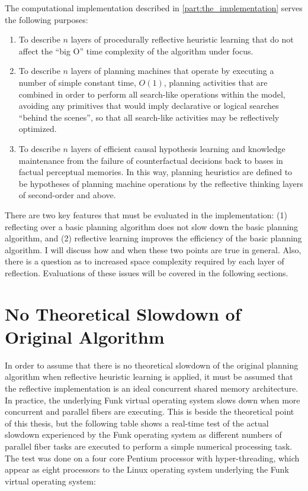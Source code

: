 The computational implementation described in
{\mbox{\autoref{part:the_implementation}}} serves the following
purposes:
\begin{enumerate}
\item To describe $n$ layers of procedurally reflective heuristic
  learning that do not affect the ``big O'' time complexity of the
  algorithm under focus.
\item To describe $n$ layers of planning machines that operate by
  executing a number of simple constant time, $O(1)$, planning
  activities that are combined in order to perform all search-like
  operations within the model, avoiding any primitives that would
  imply declarative or logical searches ``behind the scenes'', so that
  all search-like activities may be reflectively optimized.
\item To describe $n$ layers of efficient causal hypothesis learning
  and knowledge maintenance from the failure of counterfactual
  decisions back to bases in factual perceptual memories.  In this
  way, planning heuristics are defined to be hypotheses of planning
  machine operations by the reflective thinking layers of second-order
  and above.
\end{enumerate}
There are two key features that must be evaluated in the
implementation: (1) reflecting over a basic planning algorithm does
not slow down the basic planning algorithm, and (2) reflective
learning improves the efficiency of the basic planning algorithm.  I
will discuss how and when these two points are true in general.  Also,
there is a question as to increased space complexity required by each
layer of reflection.  Evaluations of these issues will be covered in
the following sections.

\section{No Theoretical Slowdown of Original Algorithm}

In order to assume that there is no theoretical slowdown of the
original planning algorithm when reflective heuristic learning is
applied, it must be assumed that the reflective implementation is an
ideal concurrent shared memory architecture.  In practice, the
underlying Funk virtual operating system slows down when more
concurrent and parallel fibers are executing.  This is beside the
theoretical point of this thesis, but the following table shows a
real-time test of the actual slowdown experienced by the Funk
operating system as different numbers of parallel fiber tasks are
executed to perform a simple numerical processing task.  The test was
done on a four core Pentium processor with hyper-threading, which
appear as eight processors to the Linux operating system underlying
the Funk virtual operating system:

